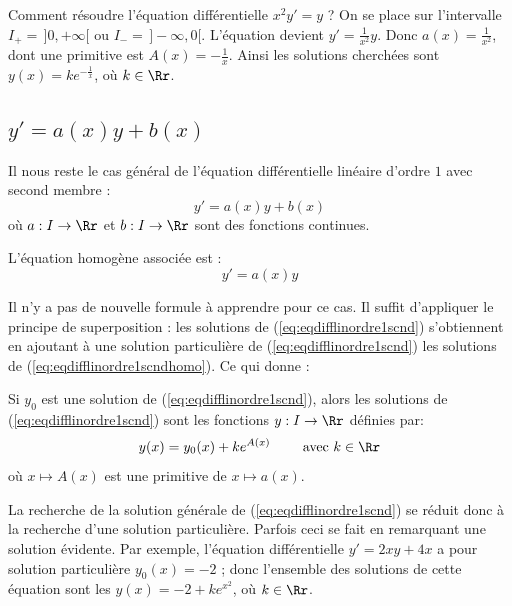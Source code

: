 \documentclass[class=report,crop=false]{standalone}
\begin{document}
\begin{exemple}
Comment résoudre l'équation différentielle $x^2y'=y$ ?
On se place sur l'intervalle $I_+=\,]0,+\infty[$ ou $I_-=\,]-\infty,0[$.
L'équation devient $y'= \frac{1}{x^2}y$. Donc $a(x)=\frac{1}{x^2}$, dont une primitive est
$A(x)=-\frac1x$. Ainsi les solutions cherchées sont
$y(x) = k e^{-\frac1x}$, où $k\in\Rr$.
\end{exemple}


\subsection{$y' = a(x)y+b(x)$}

Il nous reste le cas général de l'équation différentielle linéaire d'ordre $1$ avec second membre :
\begin{equation}
   y' = a(x) y  + b(x)
  \label{eq:eqdifflinordre1scnd}
  \tag{$E$}
\end{equation}
où $a : I \to \Rr$ et $b: I \to \Rr$ sont des fonctions continues.

L'équation homogène associée est :
\begin{equation}
   y' = a(x) y
  \label{eq:eqdifflinordre1scndhomo}
  \tag{$E_0$}
\end{equation}

Il n'y a pas de nouvelle formule à apprendre pour ce cas.
Il suffit d'appliquer le principe de superposition : les solutions de (\ref{eq:eqdifflinordre1scnd}) s'obtiennent en
ajoutant à une solution particulière de (\ref{eq:eqdifflinordre1scnd}) les solutions de
(\ref{eq:eqdifflinordre1scndhomo}).
Ce qui donne :
\begin{proposition}
Si $y_0$ est une solution de (\ref{eq:eqdifflinordre1scnd}),
alors les solutions de (\ref{eq:eqdifflinordre1scnd}) sont les
fonctions $y : I \to \Rr$ définies par:
$$y(x)= y_0(x)+k e^{A(x)} \qquad \text{ avec } k \in \Rr$$
où $x\mapsto A(x)$ est une primitive de $x \mapsto a(x)$.
\end{proposition}


\bigskip
La recherche de la solution générale de (\ref{eq:eqdifflinordre1scnd}) se réduit
donc à la recherche d'une solution particulière. Parfois ceci
se fait en remarquant une solution évidente. Par exemple,
l'équation différentielle $y'=2xy+4x$
a pour solution particulière $y_0(x)=-2$ ;
donc l'ensemble des solutions de cette équation sont les
$y(x) = -2 + ke^{x^2}$, où $k\in\Rr$.

\bigskip
\bigskip
\end{document}
